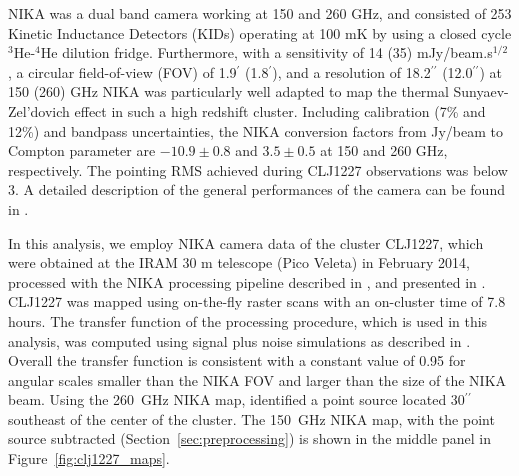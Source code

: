 \documentclass[onecolumn,traditabstract]{aa}
\begin{document}
NIKA \citep{monfardini2010,monfardini2014} was a dual band camera working at 150 and
260 GHz, and consisted of 253 Kinetic Inductance Detectors (KIDs) operating at 100 mK by using a closed cycle $^3$He-$^4$He dilution fridge. 
Furthermore, with a sensitivity of 14 (35) mJy/beam.s$^{1/2}$ , a circular field-of-view (FOV) of 1.9$^{\prime}$ (1.8$^{\prime}$), and a
resolution of 18.2$^{\prime \prime}$ (12.0$^{\prime \prime}$) at 150 (260) GHz NIKA was particularly well adapted to map the thermal
Sunyaev-Zel'dovich effect in such a high redshift cluster. Including calibration (7\% and 12\%) and bandpass uncertainties, the NIKA conversion
factors from Jy/beam to Compton parameter are $-10.9 \pm 0.8$ and $3.5\pm0.5$ at 150 and 260 GHz, respectively. The pointing RMS
achieved during CLJ1227 observations was below 3\asec.
A detailed description of the general performances of the camera can be found in \citet{catalano2014,adam2014}.

In this analysis, we employ NIKA camera data of the cluster CLJ1227, which were obtained at the IRAM 30 m telescope (Pico Veleta)
in February 2014, processed with the NIKA processing pipeline described in \citet{adam2014}, and  presented in \citet{adam2015}.
CLJ1227 was mapped using on-the-fly raster scans with an on-cluster time of 7.8 hours.
The transfer function of the processing procedure, which is used in this analysis, was computed using signal plus noise simulations as
described in \citet{adam2015}.
Overall the transfer function is consistent with a constant value of 0.95 for angular scales smaller than the NIKA FOV and larger
than the size of the NIKA beam. Using the 260~GHz NIKA map, \citet{adam2015} identified a point source located 30$^{\prime \prime}$
southeast of the center of the cluster. The 150~GHz NIKA map, with the point source subtracted (Section~\ref{sec:preprocessing})
is shown in the middle panel in Figure~\ref{fig:clj1227_maps}.
\end{document}
